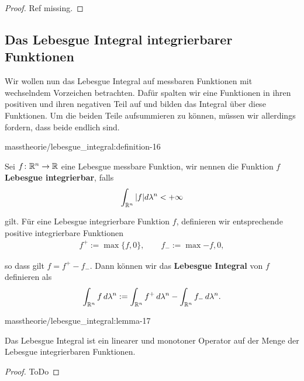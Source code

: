 \begin{proof}
 Ref missing.
\end{proof}


\subsection{Das Lebesgue Integral integrierbarer Funktionen}
\label{\detokenize{masstheorie/lebesgue_integral:das-lebesgue-integral-integrierbarer-funktionen}}
\par
Wir wollen nun das Lebesgue Integral auf messbaren Funktionen mit wechselndem Vorzeichen betrachten. Dafür spalten wir eine Funktionen in ihren positiven und ihren negativen Teil auf und bilden das Integral über diese Funktionen. Um die beiden Teile aufsummieren zu können, müssen wir allerdings fordern, dass beide endlich sind.
\begin{definition}{}{masstheorie/lebesgue_integral:definition-16}



\par
Sei \(f \colon \mathbb{R}^n \rightarrow \mathbb{R}\) eine Lebesgue messbare Funktion, wir nennen die Funktion \(f\) \textbf{Lebesgue integrierbar}, falls
\begin{align*}
\int_{\mathbb{R}^n} \vert f \vert d\lambda^n < +\infty
\end{align*}
\par
gilt. Für eine Lebesgue integrierbare Funktion \(f\), definieren wir entsprechende positive integrierbare Funktionen
\begin{align*}
f^+ := \max \lbrace f, 0 \rbrace, \qquad f_- := \max{-f, 0},
\end{align*}
\par
so dass gilt \(f = f^+ - f_-\). Dann können wir das \textbf{Lebesgue Integral} von \(f\) definieren als
\begin{align*}
\int_{\mathbb{R}^n} f\, d\lambda^n := \int_{\mathbb{R}^n} f^+\, d\lambda^n - \int_{\mathbb{R}^n} f_-\, d\lambda^n.
\end{align*}\end{definition}
\begin{lemma}{}{masstheorie/lebesgue_integral:lemma-17}



\par
Das Lebesgue Integral ist ein linearer und monotoner Operator auf der Menge der Lebesgue integrierbaren Funktionen.
\end{lemma}

\begin{proof}
 ToDo
\end{proof}

